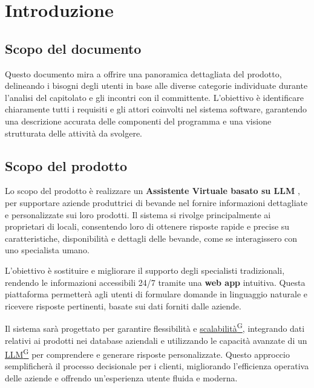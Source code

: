\section{Introduzione}

\subsection{Scopo del documento}
Questo documento mira a offrire una panoramica dettagliata del prodotto, 
delineando i bisogni degli utenti in base alle diverse categorie individuate durante 
l'analisi del capitolato e gli incontri con il committente.
L'obiettivo è identificare chiaramente tutti i requisiti e gli attori coinvolti
nel sistema software, garantendo una descrizione accurata delle componenti del programma
e una visione strutturata delle attività da svolgere. 

\subsection{Scopo del prodotto}
Lo scopo del prodotto è realizzare un \textbf{Assistente Virtuale basato su LLM }, 
per supportare aziende produttrici di bevande nel fornire 
informazioni dettagliate e personalizzate sui loro prodotti. 
Il sistema si rivolge principalmente ai proprietari di locali, 
consentendo loro di ottenere risposte rapide e precise su caratteristiche, 
disponibilità e dettagli delle bevande, come se interagissero con uno specialista umano.

L’obiettivo è sostituire e migliorare il supporto degli specialisti tradizionali, 
rendendo le informazioni accessibili 24/7 tramite una \textbf{web app} intuitiva. 
Questa piattaforma permetterà agli utenti di formulare domande in linguaggio naturale 
e ricevere risposte pertinenti, basate sui dati forniti dalle aziende. 

Il sistema sarà progettato per garantire flessibilità e \href{https://code7crusaders.github.io/docs/RTB/documentazione_interna/glossario.html#scalabilità}{scalabilità\textsuperscript{G}}, 
integrando dati relativi ai prodotti nei database aziendali e utilizzando 
le capacità avanzate di un \href{https://code7crusaders.github.io/docs/RTB/documentazione_interna/glossario.html#llm-large-language-model}{LLM\textsuperscript{G}} per comprendere e generare risposte personalizzate. 
Questo approccio semplificherà il processo decisionale per i clienti, 
migliorando l’efficienza operativa delle aziende e offrendo 
un’esperienza utente fluida e moderna.

